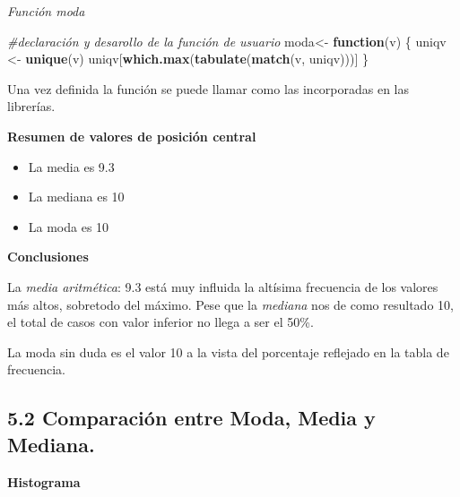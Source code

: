 \documentclass[
]{article}
\newenvironment{Shaded}{\begin{snugshade}}{\end{snugshade}}
\newcommand{\CommentTok}[1]{\textcolor[rgb]{0.56,0.35,0.01}{\textit{#1}}}
\newcommand{\ControlFlowTok}[1]{\textcolor[rgb]{0.13,0.29,0.53}{\textbf{#1}}}
\newcommand{\FunctionTok}[1]{\textcolor[rgb]{0.13,0.29,0.53}{\textbf{#1}}}
\newcommand{\NormalTok}[1]{#1}
\newcommand{\OtherTok}[1]{\textcolor[rgb]{0.56,0.35,0.01}{#1}}
\newcommand{\SpecialCharTok}[1]{\textcolor[rgb]{0.81,0.36,0.00}{\textbf{#1}}}
\providecommand{\tightlist}{%
  \setlength{\itemsep}{0pt}\setlength{\parskip}{0pt}}
\begin{document}
\emph{Función moda}

\begin{Shaded}
\begin{Highlighting}[]
\CommentTok{\#declaración y desarollo de la función de usuario}
\NormalTok{moda}\OtherTok{\textless{}{-}} \ControlFlowTok{function}\NormalTok{(v) \{}
\NormalTok{uniqv }\OtherTok{\textless{}{-}} \FunctionTok{unique}\NormalTok{(v)}
\NormalTok{uniqv[}\FunctionTok{which.max}\NormalTok{(}\FunctionTok{tabulate}\NormalTok{(}\FunctionTok{match}\NormalTok{(v, uniqv)))]}
\NormalTok{\}}
\end{Highlighting}
\end{Shaded}

Una vez definida la función se puede llamar como las incorporadas en las
librerías.

\begin{Shaded}
\end{Shaded}

\textbf{Resumen de valores de posición central}

\begin{itemize}
\tightlist
\item
  La media es 9.3
\item
  La mediana es 10
\item
  La moda es 10
\end{itemize}

\textbf{Conclusiones}

La \emph{media aritmética}: 9.3 está muy influida la altísima frecuencia
de los valores más altos, sobretodo del máximo. Pese que la
\emph{mediana} nos de como resultado 10, el total de casos con valor
inferior no llega a ser el 50\%.

La moda sin duda es el valor 10 a la vista del porcentaje reflejado en
la tabla de frecuencia.

\hypertarget{comparaciuxf3n-entre-moda-media-y-mediana.}{%
\subsection{5.2 Comparación entre Moda, Media y
Mediana.}\label{comparaciuxf3n-entre-moda-media-y-mediana.}}

\textbf{Histograma}
\end{document}
